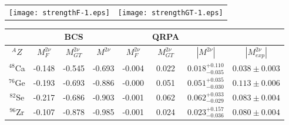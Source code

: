 \documentclass[nofootinbib,twocolumn,eqsecnum,floats,aps]{revtex4}
\def\x{\times}
\def\b {{\beta}}
\begin{document}
{\begin{table}[th]
\begin{tabular}{c|cccccc}
\hline
\end{tabular}
\end{table}
\begin{figure*}[t]
\begin{tabular}{cc}
\texttt{[image: strengthF-1.eps]}
&
\texttt{[image: strengthGT-1.eps]}
\end{tabular}
\caption{\label{F1} (Color online) $\b^+$-decay transition strengths, $2\nu$ NM given
in natural units, and $0\nu$ NM normalized to $g_A^2$.
We show vector observables, as a function of the
ratio $s={\it v}_{pp}^s / { \overline v}^s_{pair}$, on the left side, and
axial-vector ones,  as a function of the  ratio $t={\it v}_{pp}^t/ { \overline v}^s_{pair}$,
on the right side. The values of $t_{sym}$ on the axis $t$ are indicated by points.}
\end{figure*}
\begin{table*}[t]
\centering
\caption{$\beta\beta_{2\nu}$-decay moments evaluated within the
BCS (unperturbed) and QRPA (perturbed) approximations  are compared
with the experimental results  $|M^{2\nu}_{exp}|$
recommended by Barabash~\cite{Bar15}. All the quantities are
given in natural units. As explained in the text,
the upper and lower theoretical errors on $M^{2\nu}$
were evaluated with $t=1.03\x t_{sym}$,
and $t=0.97\x t_{sym}$, respectively, where the values
of  $t_{sym}$ are those listed in Table \ref{T1}.}
\label{T2}
\bigskip
\begin{tabular}{c|ccc|ccc|c}
\hline
&&BCS&&&QRPA&&\\
\hline
$^AZ$ & $M^{2\nu}_F$& $M^{2\nu}_{GT}$  &$M^{2\nu}$
             &  $M^{2\nu}_F$ &$M^{2\nu}_{GT}$ &$|M^{2\nu}|$
            &  $|M^{2\nu}_{exp}|$\\
\hline
 $^{48}$Ca &    -0.148 &  -0.545 &   -0.693 &        -0.004 &   0.022 & $0.018^{+0.110}_{-0.035}$  & $0.038\pm0.003$\\
 $^{76}$Ge &    -0.193 &  -0.693 &   -0.886 &        -0.000 &   0.051 & $0.051^{+0.035}_{-0.030}$ & $0.113\pm0.006$\\
 $^{82}$Se &    -0.217 &  -0.686 &   -0.903 &        -0.001 &   0.062 & $0.062^{+0.033}_{-0.029}$ & $0.083\pm0.004$\\
 $^{96}$Zr &    -0.107 &  -0.878 &   -0.985 &        -0.001 &   0.024 & $0.023^{+0.157}_{-0.036}$ & $0.080\pm0.004$\\

\end{tabular}
\end{table*}}
\end{document}
